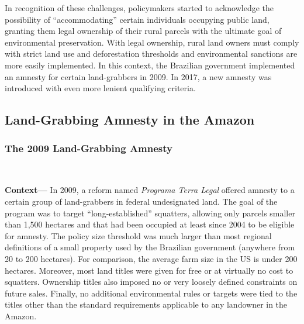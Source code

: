 \documentclass[12pt]{article}
\begin{document}
\quad In recognition of these challenges, policymakers started to acknowledge the possibility of ``accommodating'' certain individuals occupying public land, granting them legal ownership of their rural parcels with the ultimate goal of environmental preservation. With legal ownership, rural land owners must comply with strict land use and deforestation thresholds and environmental sanctions are more easily implemented. In this context, the Brazilian government implemented an amnesty for certain land-grabbers in 2009. In 2017, a new amnesty was introduced with even more lenient qualifying criteria. 


\subsection{Land-Grabbing Amnesty in the Amazon}

\subsubsection{The 2009 Land-Grabbing Amnesty}
\ 

\quad \textbf{Context---} In 2009, a reform named \textit{Programa Terra Legal} offered amnesty to a certain group of land-grabbers in federal undesignated land. The goal of the program was to target ``long-established'' squatters, allowing only parcels smaller than 1,500 hectares and that had been occupied at least since 2004 to be eligible for amnesty. The policy size threshold was much larger than most regional definitions of a small property used by the Brazilian government (anywhere from 20 to 200 hectares). For comparison, the average farm size in the US is under 200 hectares. Moreover, most land titles were given for free or at virtually no cost to squatters. Ownership titles also imposed no or very loosely defined constraints on future sales. Finally, no additional environmental rules or targets were tied to the titles other than the standard requirements applicable to any landowner in the Amazon.
\ 
\end{document}
